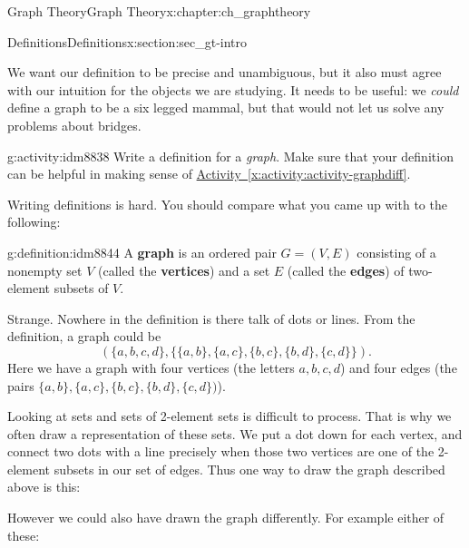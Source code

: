 \documentclass[oneside,10pt,]{book}
\newcommand{\terminology}[1]{\textbf{#1}}
\numberwithin{equation}{chapter}
\newcommand{\vtx}[2]{node[fill,circle,inner sep=0pt, minimum size=4pt,label=#1:#2]{}}
\newcommand{\vr}[1]{\vtx{right}{#1}}
\newcommand{\vl}[1]{\vtx{left}{#1}}
\begin{document}
\begin{chapterptx}{Graph Theory}{}{Graph Theory}{}{}{x:chapter:ch_graphtheory}
\begin{sectionptx}{Definitions}{}{Definitions}{}{}{x:section:sec_gt-intro}
\par
We want our definition to be precise and unambiguous, but it also must agree with our intuition for the objects we are studying.  It needs to be useful: we \emph{could} define a graph to be a six legged mammal, but that would not let us solve any problems about bridges.%
\begin{activity}{}{g:activity:idm8838}%
Write a definition for a \emph{graph}.  Make sure that your definition can be helpful in making sense of \hyperref[x:activity:activity-graphdiff]{Activity~\ref{x:activity:activity-graphdiff}}.%
\end{activity}
Writing definitions is hard.  You should compare what you came up with to the following:%
\begin{definition}{}{g:definition:idm8844}%
A \terminology{graph} is an ordered pair \(G = (V, E)\) consisting of a nonempty set \(V\) (called the \terminology{vertices}) and a set \(E\) (called the \terminology{edges}) of two-element subsets of \(V\).%
\end{definition}
Strange.  Nowhere in the definition is there talk of dots or lines.  From the definition, a graph could be%
\begin{equation*}
(\{a,b,c,d\}, \{\{a,b\}, \{a,c\}, \{b,c\}, \{b,d\}, \{c,d\}\}).
\end{equation*}
Here we have a graph with four vertices  (the letters \(a, b, c, d\)) and four edges (the pairs \(\{a,b\}, \{a,c\}, \{b,c\}, \{b,d\}, \{c,d\})\)).%
\par
Looking at sets and sets of 2-element sets is difficult to process.  That is why we often draw a representation of these sets.  We put a dot down for each vertex, and connect two dots with a line precisely when those two vertices are one of the 2-element subsets in our set of edges.  Thus one way to draw the graph described above is this:%
\begin{sidebyside}{1}{0.375}{0.375}{0}%
\begin{sbspanel}{0.25}%
\resizebox{\linewidth}{!}{%
\begin{tikzpicture}[scale=0.7]
   \draw  (-1,1) \vl{\(a\)} -- (1,1) \vr{\(b\)} (-1,1) -- (-1,-1) \vl{\(c\)} -- (1,-1) \vr{\(d\)} -- (1,1) -- (-1,-1);
 \end{tikzpicture}
}%
\end{sbspanel}%
\end{sidebyside}%
\par
However we could also have drawn the graph differently. For example either of these:%
\begin{sidebyside}{2}{0.1375}{0.1375}{0.275}%

\end{sidebyside}
\end{sectionptx}
\end{chapterptx}
\end{document}
